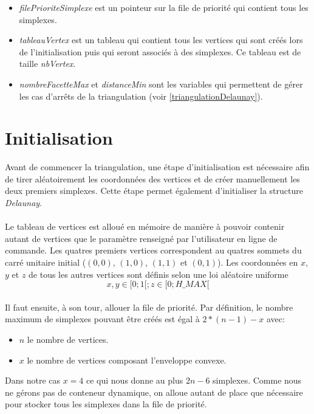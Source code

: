 \documentclass{article}
\begin{document}
    \begin{itemize}
    \item \textit{filePrioriteSimplexe} est un pointeur sur la file de priorité qui contient tous les simplexes.
    \item \textit{tableauVertex} est un tableau qui contient tous les vertices qui sont créés lors de l'initialisation puis qui seront associés à des simplexes. Ce tableau est de taille \textit{nbVertex}.
    \item \textit{nombreFacetteMax} et \textit{distanceMin} sont les variables qui permettent de gérer les cas d'arrêts de la triangulation (voir \ref{triangulationDelaunay}).
    \end{itemize}

\section{Initialisation}
    Avant de commencer la triangulation, une étape d'initialisation est nécessaire afin de tirer aléatoirement les coordonnées des vertices et de créer manuellement les deux premiers simplexes. Cette étape permet également d'initialiser la structure \textit{Delaunay}.
    
    \paragraph{}
    Le tableau de vertices est alloué en mémoire de manière à pouvoir contenir autant de vertices que le paramètre renseigné par l'utilisateur en ligne de commande. 
    Les quatres premiers vertices correspondent au quatres sommets du carré unitaire initial ($(0,0)$, $(1,0)$, $(1,1)$ et $(0,1)$). Les coordonnées en $x$, $y$ et $z$ de tous les autres vertices sont définis selon une loi aléatoire uniforme \[x,y \in[0;1[ ; z \in[0; \textit{H\_MAX}[\]
    
    \paragraph{}
    Il faut ensuite, à son tour, allouer la file de priorité. Par définition, le nombre maximum de simplexes pouvant être créés est égal à $2*(n - 1) - x$ avec:
        \begin{itemize}
        \item $n$ le nombre de vertices.
        \item $x$ le nombre de vertices composant l'enveloppe convexe.
        \end{itemize}
    Dans notre cas $x = 4$ ce qui nous donne au plus $2n - 6$ simplexes. Comme nous ne gérons pas de conteneur dynamique, on alloue autant de place que nécessaire pour stocker tous les simplexes dans la file de priorité.
    
\end{document}
